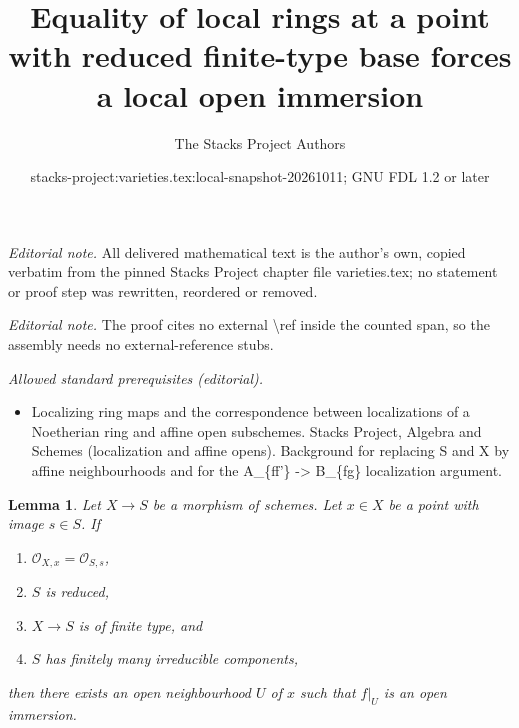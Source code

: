 \documentclass[10pt,a4paper]{amsart}
\title{Equality of local rings at a point with reduced finite-type base forces a local open immersion}
\author{The Stacks Project Authors}
\date{stacks-project:varieties.tex:local-snapshot-20261011; GNU FDL 1.2 or later}
\theoremstyle{plain}
\newtheorem{lemma}[subsection]{Lemma}
\theoremstyle{definition}
\theoremstyle{remark}
\numberwithin{equation}{subsection}
\begin{document}
\maketitle
\noindent\textit{Editorial note.} All delivered mathematical text is the author's own, copied verbatim from the pinned Stacks Project chapter file varieties.tex; no statement or proof step was rewritten, reordered or removed.\par\medskip
\noindent\textit{Editorial note.} The proof cites no external \textbackslash{}ref inside the counted span, so the assembly needs no external-reference stubs.\par\medskip
\noindent\textit{Allowed standard prerequisites (editorial).}\begin{itemize}
\item Localizing ring maps and the correspondence between localizations of a Noetherian ring and affine open subschemes. Stacks Project, Algebra and Schemes (localization and affine opens). Background for replacing S and X by affine neighbourhoods and for the A\_\{ff'\} -> B\_\{fg\} localization argument.
\end{itemize}\medskip
\begin{lemma}
\label{lemma-local-isomorphism}
Let $X \to S$ be a morphism of schemes. Let $x \in X$ be a point with
image $s \in S$. If
\begin{enumerate}
\item $\mathcal{O}_{X, x} = \mathcal{O}_{S, s}$,
\item $S$ is reduced,
\item $X \to S$ is of finite type, and
\item $S$ has finitely many irreducible components,
\end{enumerate}
then there exists an open neighbourhood $U$
of $x$ such that $f|_U$ is an open immersion.
\end{lemma}
\end{document}
